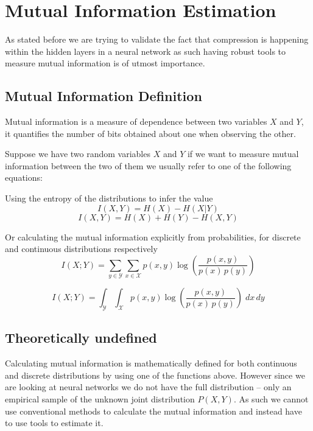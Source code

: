 
\section{Mutual Information Estimation}

As stated before we are trying to validate the fact that compression is
happening within the hidden layers in a neural network as such having robust
tools to measure mutual information is of utmost importance. 

\subsection{Mutual Information Definition}

Mutual information is a measure of dependence between two variables $ X $ and $
Y $, it quantifies the number of bits obtained about one when observing the
other.

Suppose we have two random variables $ X $ and $ Y $ if we want to measure
mutual information between the two of them we usually refer to one of the
following equations:

\medskip

Using the entropy of the distributions to infer the value
\begin{equation}
  I(X, Y) = H(X) - H(X|Y)
\end{equation}
\begin{equation}
  I(X, Y) = H(X) + H(Y) - H(X,Y)
\end{equation}

Or calculating the mutual information explicitly from probabilities, for
discrete and continuous distributions respectively
\begin{equation}
      {I} (X;Y)=\sum _{y\in {\mathcal {Y}}}\sum _{x\in {\mathcal
      {X}}}{p(x,y)\log {\left({\frac {p(x,y)}{p(x)\,p(y)}}\right)}} 
\end{equation}

\begin{equation}
    {I} (X;Y)=\int _{\mathcal {Y}}\int _{\mathcal {X}}{p(x,y)\log {\left({\frac
    {p(x,y)}{p(x)\,p(y)}}\right)}}\;dx\,dy
\end{equation}


\subsection{Theoretically undefined}

Calculating mutual information is mathematically defined for both continuous and
discrete distributions by using one of the functions above. However since we are
looking at neural networks we do not have the full distribution -- only an
empirical sample of the unknown joint distribution $ P(X,Y) $. As such we cannot
use conventional methods to calculate the mutual information and instead have to
use tools to estimate it.

